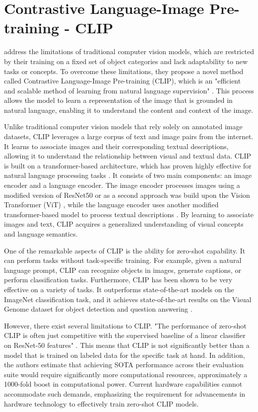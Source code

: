 \section{Contrastive Language-Image Pre-training - CLIP}
\label{CLIP}

\citeauthor{radfordCLIP} address the limitations of traditional computer vision models, which are restricted by their training on a fixed set of object categories and lack adaptability to new tasks or concepts. To overcome these limitations, they propose a novel method called Contrastive Language-Image Pre-training (CLIP), which is an "efficient and scalable method of learning from natural language supervision" \citep{radfordCLIP}. This process allows the model to learn a representation of the image that is grounded in natural language, enabling it to understand the content and context of the image.

Unlike traditional computer vision models that rely solely on annotated image datasets, CLIP leverages a large corpus of text and image pairs from the internet. It learns to associate images and their corresponding textual descriptions, allowing it to understand the relationship between visual and textual data. CLIP is built on a transformer-based architecture, which has proven highly effective for natural language processing tasks \citep{radfordCLIP}. It consists of two main components: an image encoder and a language encoder. The image encoder processes images using a modified version of ResNet50 \citep{heResnet} or as a second approach was build upon the Vision Transformer (ViT) \citep{dosovitskiyViT}, while the language encoder uses another modified transformer-based model to process textual descriptions \citep{vaswani2023attention}. By learning to associate images and text, CLIP acquires a generalized understanding of visual concepts and language semantics.

One of the remarkable aspects of CLIP is the ability for zero-shot capability. It can perform tasks without task-specific training. For example, given a natural language prompt, CLIP can recognize objects in images, generate captions, or perform classification tasks. Furthermore, CLIP has been shown to be very effective on a variety of tasks. It outperforms state-of-the-art models on the ImageNet classification task, and it achieves state-of-the-art results on the Visual Genome dataset for object detection and question answering \citep{radfordCLIP}.

However, there exist several limitations to CLIP. "The performance of zero-shot CLIP is often just competitive with the supervised baseline of a linear classifier on ResNet-50 features" \citep{radfordCLIP}.  This means that CLIP is not significantly better than a model that is trained on labeled data for the specific task at hand. In addition, the authors estimate that achieving SOTA performance across their evaluation suite would require significantly more computational resources, approximately a 1000-fold boost in computational power. Current hardware capabilities cannot accommodate such demands, emphasizing the requirement for advancements in hardware technology to effectively train zero-shot CLIP models.